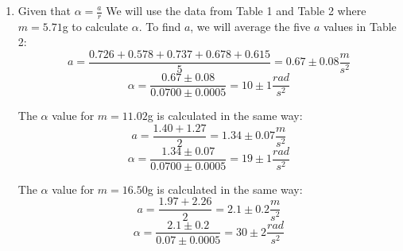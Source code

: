 \documentclass[10pt, letterpaper]{article}
\begin{document}
\begin{enumerate}
  \item Given that $\alpha = \frac{a}{r}$
      We will use the data from Table 1 and Table 2 where $m = 5.71$g to calculate $\alpha $. To find $a$, we will average the five $a$ values in Table 2: \\[3]
      \[ a = \frac{0.726 + 0.578 + 0.737 + 0.678 + 0.615}{5} = 0.67 \pm 0.08 \frac{m}{s^2} \]
      \[\alpha = \frac{0.67 \pm 0.08}{0.0700 \pm 0.0005} = \boxed{10 \pm 1 \frac{rad}{s^2}} \]

      The $\alpha $ value for $m = 11.02$g is calculated in the same way: \\[3]
      \[ a = \frac{1.40 + 1.27}{2} = 1.34 \pm 0.07 \frac{m}{s^2} \]
      \[\alpha = \frac{1.34 \pm 0.07}{0.0700 \pm 0.0005} = \boxed{19 \pm 1 \frac{rad}{s^2}} \]

      The $\alpha $ value for $m = 16.50$g is calculated in the same way: \\[3]
      \[ a = \frac{1.97 + 2.26}{2} = 2.1 \pm 0.2 \frac{m}{s^2} \]
      \[\alpha = \frac{2.1 \pm 0.2}{0.07 \pm 0.0005} = \boxed{30 \pm 2 \frac{rad}{s^2}} \]


\end{enumerate}
\end{document}
